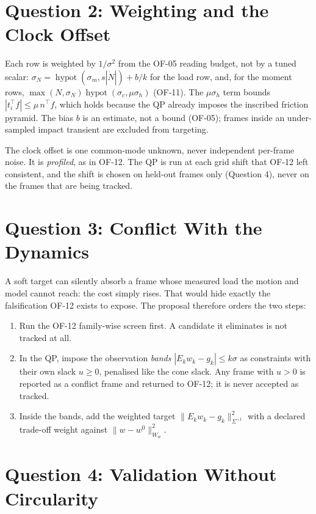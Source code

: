 \documentclass[11pt]{article}
\begin{document}
\section{Question 2: Weighting and the Clock Offset}

Each row is weighted by $1/\sigma^2$ from the OF-05 reading budget, not by a
tuned scalar:
$\sigma_N = \operatorname{hypot}(\sigma_m, s|\dot N|) + b/k$ for the load
row, and, for the moment rows,
$\max(N,\sigma_N)\operatorname{hypot}(\sigma_c, \mu\sigma_h)$ (OF-11). The
$\mu\sigma_h$ term bounds $|t_i^\top f| \le \mu\, n^\top f$, which holds
because the QP already imposes the inscribed friction pyramid. The bias $b$ is
an estimate, not a bound (OF-05); frames inside an under-sampled impact
transient are excluded from targeting.

The clock offset is one common-mode unknown, never independent per-frame
noise. It is \emph{profiled}, as in OF-12. The QP is run at each grid shift
that OF-12 left consistent, and the shift is chosen on held-out frames only
(Question 4), never on the frames that are being tracked.

\section{Question 3: Conflict With the Dynamics}

A soft target can silently absorb a frame whose measured load the motion and
model cannot reach: the cost simply rises. That would hide exactly the
falsification OF-12 exists to expose. The proposal therefore orders the
two steps:
\begin{enumerate}
  \item Run the OF-12 family-wise screen first. A candidate it eliminates is
        not tracked at all.
  \item In the QP, impose the observation \emph{bands}
        $|E_k w_k - g_k| \le k\sigma$ as constraints with their own slack
        $u \ge 0$, penalised like the cone slack. Any frame with $u > 0$ is
        reported as a conflict frame and returned to OF-12; it is never
        accepted as tracked.
  \item Inside the bands, add the weighted target
        $\|E_k w_k - g_k\|^2_{\Sigma^{-1}}$ with a declared trade-off weight
        against $\|w-w^0\|^2_{W_w}$.
\end{enumerate}

\section{Question 4: Validation Without Circularity}
\end{document}

